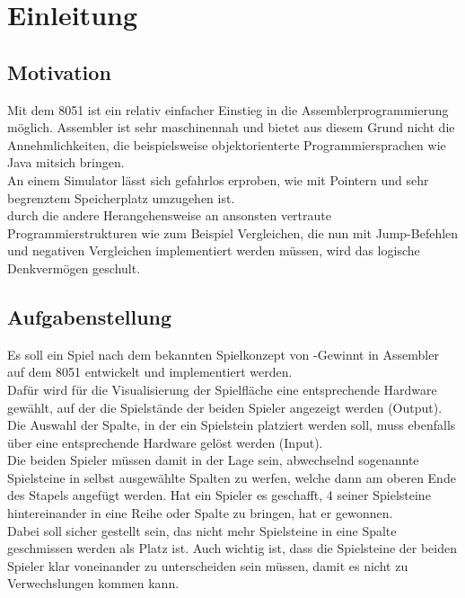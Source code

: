 



\newcommand{\autor}{Heidinger, Matthis, Riesinger, Stephan}
\newcommand{\kurs}{TINF17B1}
\newcommand{\titel}{4-Gewinnt auf einem Mikrocomputer der 8051-Famile}



\tableofcontents 

\chapter{Einleitung}

\section{Motivation}

Mit dem 8051 ist ein relativ einfacher Einstieg in die Assemblerprogrammierung möglich. Assembler ist sehr maschinennah und bietet aus diesem Grund 
nicht die Annehmlichkeiten, die beispielsweise objektorienterte Programmiersprachen wie Java mitsich bringen.\\
An einem Simulator lässt sich gefahrlos erproben, wie mit Pointern und sehr begrenztem Speicherplatz umzugehen ist.\\
durch die andere Herangehensweise an ansonsten vertraute Programmierstrukturen wie zum Beispiel Vergleichen, die nun mit Jump-Befehlen und negativen
Vergleichen implementiert werden müssen, wird das logische Denkvermögen geschult.

\section{Aufgabenstellung}

Es soll ein Spiel nach dem bekannten Spielkonzept von -Gewinnt\grqq{} in Assembler auf dem 8051 entwickelt und 
implementiert werden.\\
Dafür wird für die Visualisierung der Spielfläche eine entsprechende Hardware gewählt, 
auf der die Spielstände der beiden Spieler angezeigt werden (Output). Die Auswahl der Spalte, in der ein 
\glqq Spielstein\grqq{} platziert werden soll, muss ebenfalls über eine entsprechende Hardware gelöst werden (Input).\\
Die beiden Spieler müssen damit in der Lage sein, abwechselnd sogenannte Spielsteine in selbst ausgewählte Spalten zu werfen, 
welche dann am oberen Ende des Stapels angefügt werden. Hat ein Spieler es geschafft, 4 seiner Spielsteine hintereinander 
in eine Reihe oder Spalte zu bringen, hat er gewonnen.\\
Dabei soll sicher gestellt sein, das nicht mehr Spielsteine in eine Spalte geschmissen werden als Platz ist. Auch wichtig ist, dass die Spielsteine
der beiden Spieler klar voneinander zu unterscheiden sein müssen, damit es nicht zu Verwechslungen kommen kann. 


